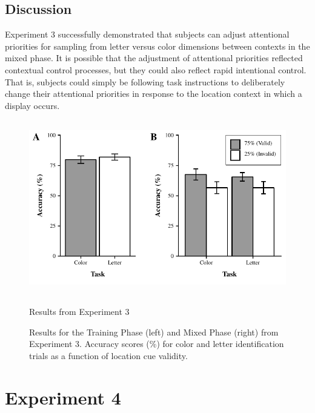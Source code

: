 \documentclass[]{DissertateCUNY}
\begin{document}
\hypertarget{discussion-2}{%
\subsection{Discussion}\label{discussion-2}}

Experiment 3 successfully demonstrated that subjects can adjust
attentional priorities for sampling from letter versus color dimensions
between contexts in the mixed phase. It is possible that the adjustment
of attentional priorities reflected contextual control processes, but
they could also reflect rapid intentional control. That is, subjects
could simply be following task instructions to deliberately change their
attentional priorities in response to the location context in which a
display occurs.

\begin{figure}
  \centering
  \includegraphics[height=3in]{figures/ICfigure4.pdf}
  \caption{Results from Experiment 3}
  \caption*{Results for the Training Phase (left) and Mixed Phase (right) from Experiment 3. Accuracy scores (\%) for color and letter identification trials as a
function of location cue validity.}
  \label{IC_figure4}
\end{figure}

\hypertarget{experiment-4}{%
\section{Experiment 4}\label{experiment-4}}
\end{document}
